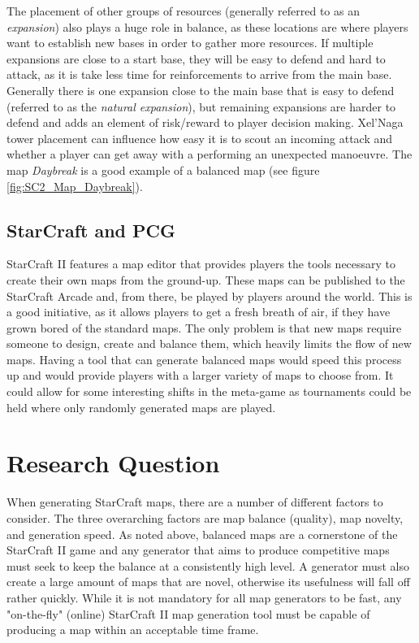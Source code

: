 The placement of other groups of resources (generally referred to as an \textit{expansion}) also plays a huge role in balance, as these locations are where players want to establish new bases in order to gather more resources. If multiple expansions are close to a start base, they will be easy to defend and hard to attack, as it is take less time for reinforcements to arrive from the main base. Generally there is one expansion close to the main base that is easy to defend (referred to as the \textit{natural expansion}), but remaining expansions are harder to defend and adds an element of risk/reward to player decision making. Xel'Naga tower placement can influence how easy it is to scout an incoming attack and whether a player can get away with a performing an unexpected manoeuvre. The map \textit{Daybreak} is a good example of a balanced map (see figure \ref{fig:SC2_Map_Daybreak}).


\subsection{StarCraft and PCG}
\label{introduction_starcraft_pcg}
StarCraft II features a map editor that provides players the tools necessary to create their own maps from the ground-up. These maps can be published to the StarCraft Arcade\cite{starcraftarcade} and, from there, be played by players around the world. This is a good initiative, as it allows players to get a fresh breath of air, if they have grown bored of the standard maps. The only problem is that new maps require someone to design, create and balance them, which heavily limits the flow of new maps. Having a tool that can generate balanced maps would speed this process up and would provide players with a larger variety of maps to choose from. It could allow for some interesting shifts in the meta-game as tournaments could be held where only randomly generated maps are played. 

\section{Research Question}
\label{introduction_researchquestion}
When generating StarCraft maps, there are a number of different factors to consider. The three overarching factors are map balance (quality), map novelty, and generation speed. As noted above, balanced maps are a cornerstone of the StarCraft II game and any generator that aims to produce competitive maps must seek to keep the balance at a consistently high level. A generator must also create a large amount of maps that are novel, otherwise its usefulness will fall off rather quickly. While it is not mandatory for all map generators to be fast, any "on-the-fly" (online) StarCraft II map generation tool must be capable of producing a map within an acceptable time frame.

